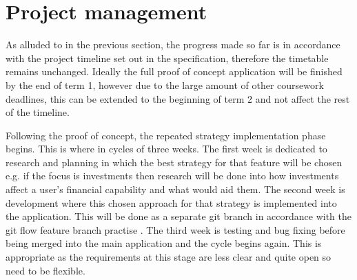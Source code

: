 \section{Project management}

As alluded to in the previous section, the progress made so far is in accordance with the project timeline set out in the specification, therefore the timetable remains unchanged. Ideally the full proof of concept application will be finished by the end of term 1, however due to the large amount of other coursework deadlines, this can be extended to the beginning of term 2 and not affect the rest of the timeline.

Following the proof of concept, the repeated strategy implementation phase begins. This is where in cycles of three weeks. The first week is dedicated to research and planning in which the best strategy for that feature will be chosen e.g. if the focus is investments then research will be done into how investments affect a user's financial capability and what would aid them. The second week is development where this chosen approach for that strategy is implemented into the application. This will be done as a separate git branch in accordance with the git flow feature branch practise \cite{GitFlow}. The third week is testing and bug fixing before being merged into the main application and the cycle begins again. This is appropriate as the requirements at this stage are less clear and quite open so need to be flexible.